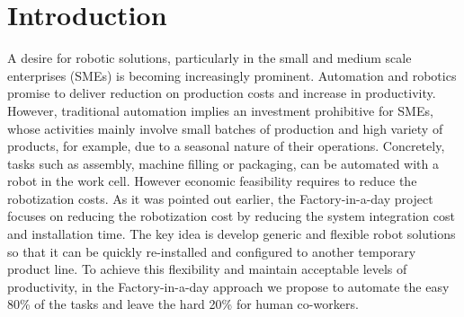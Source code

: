 \section{Introduction}
A desire for robotic solutions, particularly in the small and medium scale enterprises (SMEs) is becoming increasingly prominent. Automation and robotics promise to deliver reduction on production costs and increase in productivity. However, traditional automation implies an investment prohibitive for SMEs, whose activities mainly involve small batches of production and high variety of products, for example, due to a seasonal nature of their operations. Concretely, tasks such as assembly, machine filling or packaging, can be automated with a robot in the work cell. However economic feasibility requires to reduce the robotization costs. As it was pointed out earlier, the Factory-in-a-day project \cite{fiad} focuses on reducing the robotization cost by reducing the system integration cost and installation time. The key idea is develop generic and flexible robot solutions so that it can be quickly re-installed and configured to another temporary product line. To achieve this flexibility and maintain acceptable levels of productivity, in the Factory-in-a-day approach we propose to automate the easy 80\% of the tasks and leave the hard 20\% for human co-workers. 

